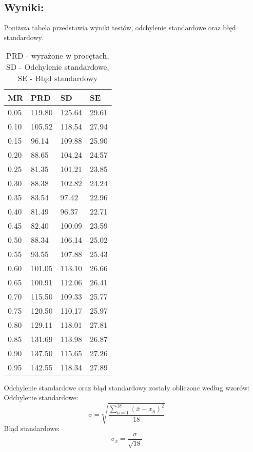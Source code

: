  \subsection{Wyniki: }
  Poniższa tabela przedstawia wyniki testów, odchylenie standardowe oraz błęd standardowy.
  \begin{table}[!ht]
    \centering
    \begin{tabular}{|l|l|l|l|}
    \hline
        MR & PRD & SD & SE \\ \hline
        0.05 & 119.80 & 125.64 & 29.61 \\ \hline
        0.10 & 105.52 & 118.54 & 27.94 \\ \hline
        0.15 & 96.14 & 109.88 & 25.90 \\ \hline
        0.20 & 88.65 & 104.24 & 24.57 \\ \hline
        0.25 & 81.35 & 101.21 & 23.85 \\ \hline
        0.30 & 88.38 & 102.82 & 24.24 \\ \hline
        0.35 & 83.54 & 97.42 & 22.96 \\ \hline
        0.40 & 81.49 & 96.37 & 22.71 \\ \hline
        0.45 & 82.40 & 100.09 & 23.59 \\ \hline
        0.50 & 88.34 & 106.14 & 25.02 \\ \hline
        0.55 & 93.55 & 107.88 & 25.43 \\ \hline
        0.60 & 101.05 & 113.10 & 26.66 \\ \hline
        0.65 & 100.91 & 112.06 & 26.41 \\ \hline
        0.70 & 115.50 & 109.33 & 25.77 \\ \hline
        0.75 & 120.50 & 110.17 & 25.97 \\ \hline
        0.80 & 129.11 & 118.01 & 27.81 \\ \hline
        0.85 & 131.69 & 113.98 & 26.87 \\ \hline
        0.90 & 137.50 & 115.65 & 27.26 \\ \hline
        0.95 & 142.55 & 118.34 & 27.89 \\ \hline
    \end{tabular}
    \caption{PRD - wyrażone w procętach, SD - Odchylenie standardowe, SE - Błąd standardowy}
  \end{table}

  Odchylenie standardowe oraz błąd standardowy zostały obliczone według wzorów: \\
  Odchylenie standardowe:
  \[ \sigma = \sqrt{\frac{\sum_{n = 1}^{18}(\bar{x} - x_n)^2}{18}} \]
  Błąd standardowe:
  \[ \sigma_{\bar{x}} = \frac{\sigma}{\sqrt{18}} \]

